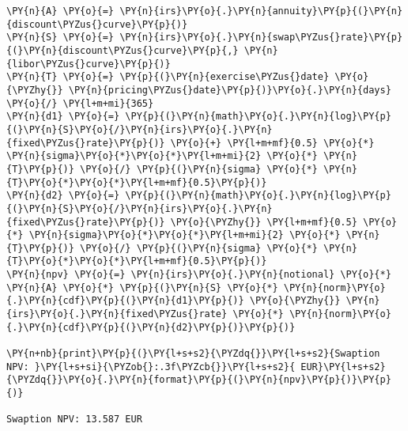 \begin{Answer}
\begin{tcolorbox}[size=fbox, boxrule=1pt, colback=cellbackground, colframe=cellborder]
\begin{Verbatim}[commandchars=\\\{\}]
\PY{n}{A} \PY{o}{=} \PY{n}{irs}\PY{o}{.}\PY{n}{annuity}\PY{p}{(}\PY{n}{discount\PYZus{}curve}\PY{p}{)}
\PY{n}{S} \PY{o}{=} \PY{n}{irs}\PY{o}{.}\PY{n}{swap\PYZus{}rate}\PY{p}{(}\PY{n}{discount\PYZus{}curve}\PY{p}{,} \PY{n}{libor\PYZus{}curve}\PY{p}{)}
\PY{n}{T} \PY{o}{=} \PY{p}{(}\PY{n}{exercise\PYZus{}date} \PY{o}{\PYZhy{}} \PY{n}{pricing\PYZus{}date}\PY{p}{)}\PY{o}{.}\PY{n}{days} \PY{o}{/} \PY{l+m+mi}{365}
\PY{n}{d1} \PY{o}{=} \PY{p}{(}\PY{n}{math}\PY{o}{.}\PY{n}{log}\PY{p}{(}\PY{n}{S}\PY{o}{/}\PY{n}{irs}\PY{o}{.}\PY{n}{fixed\PYZus{}rate}\PY{p}{)} \PY{o}{+} \PY{l+m+mf}{0.5} \PY{o}{*} \PY{n}{sigma}\PY{o}{*}\PY{o}{*}\PY{l+m+mi}{2} \PY{o}{*} \PY{n}{T}\PY{p}{)} \PY{o}{/} \PY{p}{(}\PY{n}{sigma} \PY{o}{*} \PY{n}{T}\PY{o}{*}\PY{o}{*}\PY{l+m+mf}{0.5}\PY{p}{)}
\PY{n}{d2} \PY{o}{=} \PY{p}{(}\PY{n}{math}\PY{o}{.}\PY{n}{log}\PY{p}{(}\PY{n}{S}\PY{o}{/}\PY{n}{irs}\PY{o}{.}\PY{n}{fixed\PYZus{}rate}\PY{p}{)} \PY{o}{\PYZhy{}} \PY{l+m+mf}{0.5} \PY{o}{*} \PY{n}{sigma}\PY{o}{*}\PY{o}{*}\PY{l+m+mi}{2} \PY{o}{*} \PY{n}{T}\PY{p}{)} \PY{o}{/} \PY{p}{(}\PY{n}{sigma} \PY{o}{*} \PY{n}{T}\PY{o}{*}\PY{o}{*}\PY{l+m+mf}{0.5}\PY{p}{)}
\PY{n}{npv} \PY{o}{=} \PY{n}{irs}\PY{o}{.}\PY{n}{notional} \PY{o}{*} \PY{n}{A} \PY{o}{*} \PY{p}{(}\PY{n}{S} \PY{o}{*} \PY{n}{norm}\PY{o}{.}\PY{n}{cdf}\PY{p}{(}\PY{n}{d1}\PY{p}{)} \PY{o}{\PYZhy{}} \PY{n}{irs}\PY{o}{.}\PY{n}{fixed\PYZus{}rate} \PY{o}{*} \PY{n}{norm}\PY{o}{.}\PY{n}{cdf}\PY{p}{(}\PY{n}{d2}\PY{p}{)}\PY{p}{)}

\PY{n+nb}{print}\PY{p}{(}\PY{l+s+s2}{\PYZdq{}}\PY{l+s+s2}{Swaption NPV: }\PY{l+s+si}{\PYZob{}:.3f\PYZcb{}}\PY{l+s+s2}{ EUR}\PY{l+s+s2}{\PYZdq{}}\PY{o}{.}\PY{n}{format}\PY{p}{(}\PY{n}{npv}\PY{p}{)}\PY{p}{)}

Swaption NPV: 13.587 EUR

\end{Verbatim}
\end{tcolorbox}
\end{Answer}
